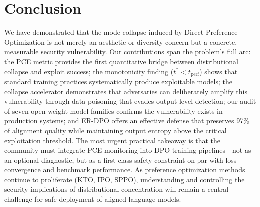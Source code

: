 \section{Conclusion}
\label{sec:conclusion}

We have demonstrated that the mode collapse induced by Direct Preference Optimization is not merely an aesthetic or diversity concern but a concrete, measurable security vulnerability. Our contributions span the problem's full arc: the PCE metric provides the first quantitative bridge between distributional collapse and exploit success; the monotonicity finding ($t^* < t_{\text{perf}}$) shows that standard training practices systematically produce exploitable models; the collapse accelerator demonstrates that adversaries can deliberately amplify this vulnerability through data poisoning that evades output-level detection; our audit of seven open-weight model families confirms the vulnerability exists in production systems; and ER-DPO offers an effective defense that preserves 97\% of alignment quality while maintaining output entropy above the critical exploitation threshold. The most urgent practical takeaway is that the community must integrate PCE monitoring into DPO training pipelines---not as an optional diagnostic, but as a first-class safety constraint on par with loss convergence and benchmark performance. As preference optimization methods continue to proliferate (KTO, IPO, SPPO), understanding and controlling the security implications of distributional concentration will remain a central challenge for safe deployment of aligned language models.

